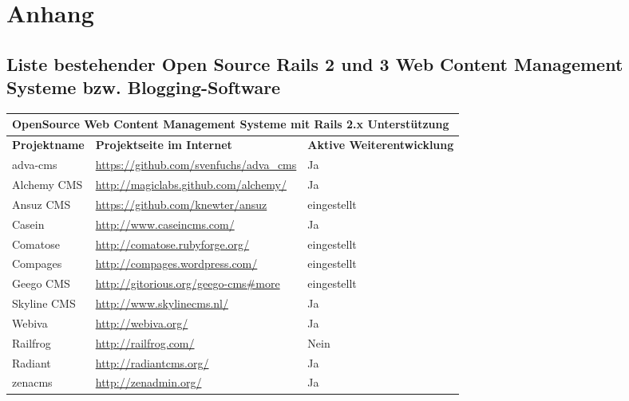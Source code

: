 \chapter{Anhang}
\section{Liste bestehender Open Source Rails 2 und 3 Web Content Management Systeme bzw. Blogging-Software}

\begin{table}[!ht]
\center
\begin{tabular}[]{|p{3cm}|p{8cm}|p{4cm}|}
\hline
\multicolumn{3}{|p{15cm}|}{\textbf{OpenSource Web Content Management Systeme mit Rails 2.x Unterstützung}}\\
\hline
\textbf{Projektname}&\textbf{Projektseite im Internet}&\textbf{Aktive Weiterentwicklung}\\
\hline
adva-cms & \href{https://github.com/svenfuchs/adva\_cms}{https://github.com/svenfuchs/adva\_cms} & Ja \\
\hline
\cellcolor{alicegrey} Alchemy CMS & \cellcolor{alicegrey} \href{http://magiclabs.github.com/alchemy/}{http://magiclabs.github.com/alchemy/} & \cellcolor{alicegrey} Ja \\
\hline
Ansuz CMS & \href{https://github.com/knewter/ansuz}{https://github.com/knewter/ansuz} & eingestellt\\
\hline
Casein & \href{http://www.caseincms.com/}{http://www.caseincms.com/} & Ja \\
\hline
Comatose & \href{http://comatose.rubyforge.org/}{http://comatose.rubyforge.org/} & eingestellt\\
\hline
Compages & \href{http://compages.wordpress.com/}{http://compages.wordpress.com/} & eingestellt\\
\hline
Geego CMS & \href{http://gitorious.org/geego-cms\#more}{http://gitorious.org/geego-cms\#more} & eingestellt\\
\hline
Skyline CMS & \href{http://www.skylinecms.nl/}{http://www.skylinecms.nl/} & Ja \\
\hline
Webiva & \href{http://webiva.org/}{http://webiva.org/} & Ja \\
\hline
Railfrog & \href{http://railfrog.com/}{http://railfrog.com/} & Nein \\
\hline
Radiant & \href{http://radiantcms.org/}{http://radiantcms.org/} & Ja \\
\hline
zenacms & \href{http://zenadmin.org/}{http://zenadmin.org/} & Ja \\

\end{tabular}
\end{table}
